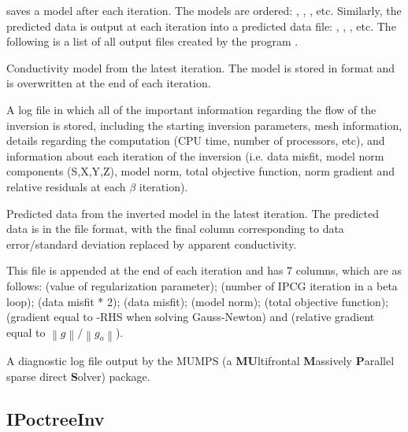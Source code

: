  saves a model after each iteration. The models are ordered: , , , etc. Similarly, the predicted data is output at each iteration into a predicted data file: , , , etc.
The following is a list of all output files created by the program .

 
\begin{description}[leftmargin=5cm, style=sameline, align=left]
\item[\fileName{inv.con}] Conductivity model from the latest iteration. The model is stored in  format and is overwritten at the end of each iteration. 
\item[\fileName{DC\_octree\_inv.txt}] A log file in which all of the important information regarding the flow of the inversion is stored, including the starting inversion parameters, mesh information, details regarding the computation (CPU time, number of processors, etc), and information about each iteration of the inversion (i.e. data misfit, model norm components (S,X,Y,Z), model norm, total objective function, norm gradient and relative residuals at each $\beta$ iteration).
\item[\fileName{dpred.txt}] Predicted data from the inverted model in the latest iteration. The predicted data is in the  file format, with the final column corresponding to data error/standard deviation replaced by apparent conductivity. 
\item[\fileName{DC\_octree\_inv.out}] This file is appended at the end of each iteration and has 7 columns, which are as follows:  (value of regularization parameter);  (number of IPCG iteration in a beta loop);  (data misfit * 2);  (data misfit);  (model norm);  (total objective function); (gradient equal to -RHS when solving Gauss-Newton) and (relative gradient equal to $\left\|g\right\|/\left\|g_{o}\right\|$). 
\item[\fileName{mumps.txt}] A diagnostic log file output by the MUMPS (a \textbf{MU}ltifrontal \textbf{M}assively \textbf{P}arallel sparse direct \textbf{S}olver) package.
\end{description}


\subsection{IPoctreeInv}

